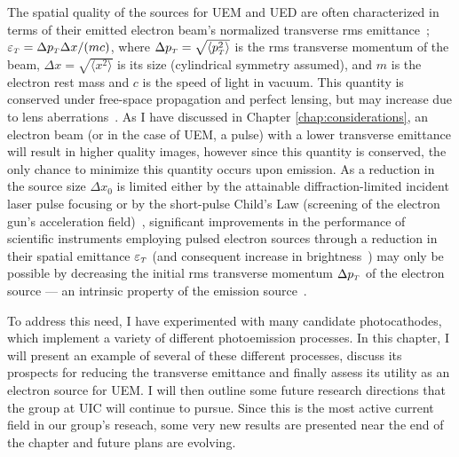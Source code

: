 

The spatial quality of the sources for UEM and UED are often characterized in terms of their emitted electron beam's normalized transverse rms emittance~\cite{dowell_quantum_2009,jensen_emittance_2010}; $\varepsilon_{{\scriptscriptstyle T}} = \Delta p_{{\scriptscriptstyle T}} \Delta x / (m c)$, where $\Delta p_{{\scriptscriptstyle T}} = \sqrt{ \langle p_{{\scriptscriptstyle T}}^2 \rangle }$ is the rms transverse momentum of the beam, $\Delta x = \sqrt{ \langle x^2 \rangle }$ is its size (cylindrical symmetry assumed), and $m$ is the electron rest mass and $c$ is the speed of light in vacuum.
This quantity is conserved under free-space propagation and perfect lensing, but may increase due to lens aberrations~\cite{oshea_reversible_1998}.
As I have discussed in Chapter \ref{chap:considerations}, an electron beam (or in the case of UEM, a pulse) with a lower transverse emittance will result in higher quality images, however since this quantity is conserved, the only chance to minimize this quantity occurs upon emission.
As a reduction in the source size $\Delta x_0$ is limited either by the attainable diffraction-limited incident laser pulse focusing or by the short-pulse Child's Law (screening of the electron gun's acceleration field)~\cite{valfells_effects_2002}, significant improvements in the performance of scientific instruments employing pulsed electron sources through a reduction in their spatial emittance $\varepsilon_{{\scriptscriptstyle T}}$ (and consequent increase in brightness~\cite{berger_dc_2009}) may only be possible by decreasing the initial rms transverse momentum $\Delta p_{{\scriptscriptstyle T}}$ of the electron source --- an intrinsic property of the emission source~\cite{dowell_quantum_2009,jensen_emittance_2010}.

To address this need, I have experimented with many candidate photocathodes, which implement a variety of different photoemission processes.
In this chapter, I will present an example of several of these different processes, discuss its prospects for reducing the transverse emittance and finally assess its utility as an electron source for UEM.
I will then outline some future research directions that the group at UIC will continue to pursue.
Since this is the most active current field in our group's reseach, some very new results are presented near the end of the chapter and future plans are evolving.

